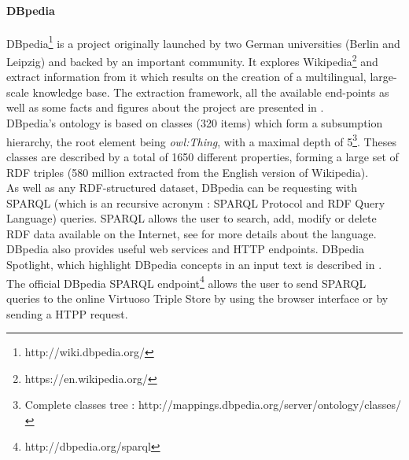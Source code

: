 \paragraph{DBpedia} %
\label{par:dbpedia}
DBpedia\footnote{http://wiki.dbpedia.org/} is a project originally launched by two German universities (Berlin and Leipzig) and backed by an important community. It explores Wikipedia\footnote{https://en.wikipedia.org/} and extract information from it which results on the creation of a multilingual, large-scale knowledge base. The extraction framework, all the available end-points as well as some facts and figures about the project are presented in \cite{lehman}.\\
DBpedia's ontology is based on classes (320 items) which form a subsumption hierarchy, the root element being \emph{owl:Thing}, with a maximal depth of 5\footnote{Complete classes tree : http://mappings.dbpedia.org/server/ontology/classes/}. Theses classes are described by a total of 1650 different properties, forming a large set of RDF triples (580 million extracted from the English version of Wikipedia).\\
As well as any RDF-structured dataset, DBpedia can be requesting with SPARQL (which is an recursive acronym : SPARQL Protocol and RDF Query Language) queries. SPARQL allows the user to search, add, modify or delete RDF data available on the Internet, see \cite{prud} for more details about the language. \\
DBpedia also provides useful web services and HTTP endpoints. DBpedia Spotlight, which highlight DBpedia concepts in an input text is described in \cite{mendes}. The official DBpedia SPARQL endpoint\footnote{http://dbpedia.org/sparql} allows the user to send SPARQL queries to the online Virtuoso Triple Store by using the browser interface or by sending a HTPP request.
